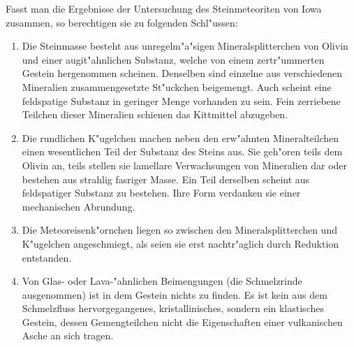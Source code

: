 \documentclass[a4paper, 11pt, oneside]{article}
\begin{document}
Fasst man die Ergebnisse der Untersuchung des Steinmeteoriten von Iowa zusammen, so berechtigen sie zu folgenden Schl"ussen:
\begin{enumerate}
    \item Die Steinmasse besteht aus unregelm"a"sigen Mineralsplitterchen von Olivin und einer augit"ahnlichen Substanz, welche von einem zertr"ummerten Gestein hergenommen scheinen. Denselben sind einzelne aus verschiedenen Mineralien zusammengesetzte St"uckchen beigemengt. Auch scheint eine feldspatige Substanz in geringer Menge vorhanden zu sein. Fein zerriebene Teilchen dieser Mineralien schienen das Kittmittel abzugeben.
    \item Die rundlichen K"ugelchen machen neben den erw"ahnten Mineralteilchen einen wesentlichen Teil der Substanz des Steins aus. Sie geh"oren teils dem Olivin an, teils stellen sie lamellare Verwachsungen von Mineralien dar oder bestehen aus strahlig fasriger Masse. Ein Teil derselben scheint aus feldspatiger Substanz zu bestehen. Ihre Form verdanken sie einer mechanischen Abrundung.
    \item Die Meteoreisenk"ornchen liegen so zwischen den Mineralsplitterchen und K"ugelchen angeschmiegt, als seien sie erst nachtr"aglich durch Reduktion entstanden.
    \item Von Glas- oder Lava-"ahnlichen Beimengungen (die Schmelzrinde ausgenommen) ist in dem Gestein nichts zu finden. Es ist kein aus dem Schmelzfluss hervorgegangenes, kristallinisches, sondern ein klastisches Gestein, dessen Gemengteilchen nicht die Eigenschaften einer vulkanischen Asche an sich tragen.
\end{enumerate}
\clearpage
\end{document}
